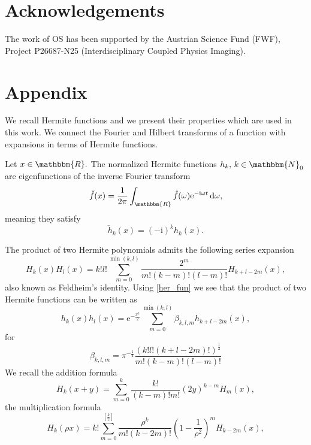 \documentclass[a4paper,twoside,10pt]{article}
\theoremstyle{break}
\theoremstyle{nonumberplain}
\newcommand{\R}{\mathbbm{R}}
\newcommand{\N}{\mathbbm{N}}
\newcommand{\e}{\mathrm e}
\renewcommand{\i}{\mathrm i}
\renewcommand{\d}{\,\mathrm d}
\begin{document}
\section*{Acknowledgements}
The work of OS has been supported by the Austrian Science Fund (FWF), Project P26687-N25 (Interdisciplinary Coupled Physics Imaging).

\section*{Appendix}\label{section_her}

We recall Hermite functions and we present their properties which are used in this work. We connect the Fourier and Hilbert transforms of a function with expansions in terms of Hermite functions. 

Let $x\in \R.$ The normalized Hermite functions $h_k , \, k \in \N_0  $ are eigenfunctions of the inverse Fourier transform
\[
\check f (x) = \frac1{2\pi}\int_\R \hat f(\omega) \e^{-\i\omega t} \d \omega ,
\]
meaning they satisfy
\begin{equation*}%
\check{h}_k (x) = (-\i)^k h_k (x) .
\end{equation*}

The product of two Hermite polynomials admits the following series expansion 
\begin{equation*}%
H_k (x) H_l (x) = k! l! \sum_{m=0}^{\min (k,l)} 
\frac{2^m}{m! (k-m)! (l-m)!} H_{k+l-2m} (x) ,
\end{equation*}
also known as Feldheim's identity. Using \eqref{her_fun} we see that the product of two Hermite functions can be written as
\begin{equation}\label{her_pro_fun}
h_k (x) h_l (x) = \e^{-\tfrac{x^2}{2}} \sum_{m=0}^{\min (k,l)} 
\beta_{k,l,m} h_{k+l-2m} (x) ,
\end{equation}
for
\[
\beta_{k,l,m} = \pi^{-\tfrac14}\frac{(k! l! (k+l-2m)!)^{\tfrac12}}{m! (k-m)! (l-m)!}
\]
We recall the addition formula \cite{Fel43, MagObeSon66}
\begin{equation}\label{her_sum}
H_k (x+y) = \sum_{m=0}^k \frac{k!}{(k-m)!m!} (2y)^{k-m} H_m(x) ,
\end{equation} 
the multiplication formula
\begin{equation*}%
H_k (\rho x) = k!\sum_{m=0}^{\left[ \tfrac{k}{2}\right] } \frac{\rho^k}{m! (k-2m)!} \left( 1-\frac{1}{\rho^2}\right)^m H_{k-2m} (x),
\end{equation*} 
\end{document}
